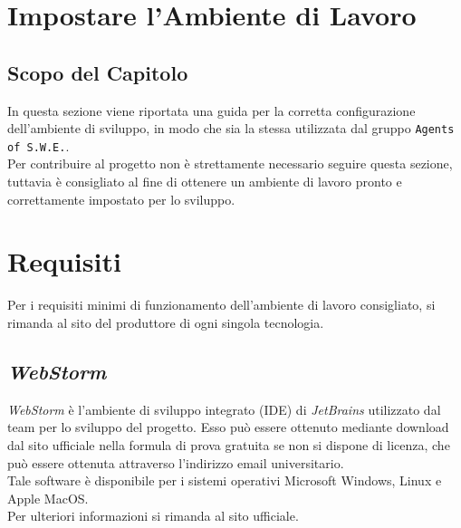 \section{Impostare l'Ambiente di Lavoro}\label{AmbienteLavoro}
\subsection{Scopo del Capitolo}\label{AmbienteLavoro_scopo}
In questa sezione viene riportata una guida per la corretta configurazione dell'ambiente di sviluppo, in modo che sia la stessa utilizzata dal gruppo \texttt{Agents of S.W.E.}.\\
Per contribuire al progetto non è strettamente necessario seguire questa sezione, tuttavia è consigliato al fine di ottenere un ambiente di lavoro pronto e correttamente impostato per lo sviluppo.

\section{Requisiti}\label{AmbienteLavoro_requisiti}
Per i requisiti minimi di funzionamento dell'ambiente di lavoro consigliato, si rimanda al sito del produttore di ogni singola tecnologia.

\subsection{\textit{WebStorm}}\label{webstorm}
\textit{WebStorm} è l'ambiente di sviluppo integrato (IDE) di \textit{JetBrains} utilizzato dal team per lo sviluppo del progetto. Esso può essere ottenuto mediante download dal sito ufficiale nella formula di prova gratuita se non si dispone di licenza, che può essere ottenuta attraverso l'indirizzo email universitario.\\
Tale software è disponibile per i sistemi operativi Microsoft Windows, Linux e Apple MacOS.\\
Per ulteriori informazioni si rimanda al sito ufficiale.


